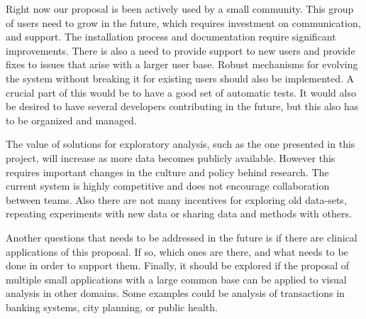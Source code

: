 Right now our proposal is been actively used by a small community. This group of users need to grow in the future, which requires investment on communication, and support. The installation process and documentation require significant improvements. There is also a need to provide support to new users and provide fixes to issues that arise with a larger user base. Robust mechanisms for evolving the system without breaking it for existing users should also be implemented. A crucial part of this would be to have a good set of automatic tests. It would also be desired to have several developers contributing in the future, but this also has to be organized and managed.

The value of solutions for exploratory analysis, such as the one presented in this project, will increase as more data becomes publicly available. However this requires important changes in the culture and policy behind research. The current system is highly competitive and does not encourage collaboration between teams. Also there are not many incentives for exploring old data-sets, repeating experiments with new data or sharing data and methods with others. 

Another questions that needs to be addressed in the future is if there are clinical applications of this proposal. If so, which ones are there, and what needs to be done in order to support them.
Finally, it should be explored if the proposal of multiple small applications with a large common base can be applied to visual analysis in other domains. Some examples could be analysis of transactions in banking systems, city planning, or public health.  
